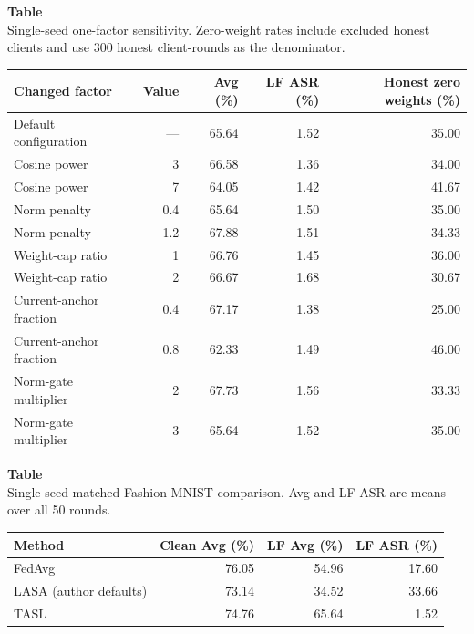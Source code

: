 \noindent\begin{minipage}{\textwidth}
\label{tab:fixed_constant_sensitivity}
\textbf{Table~\thetable}\\
Single-seed one-factor sensitivity. Zero-weight rates include excluded honest clients and use 300 honest client-rounds as the denominator.
\par\smallskip\centering\small
\setlength{\tabcolsep}{6pt}
\begin{tabular}{lrrrr}
\toprule
Changed factor & Value & Avg (\%) & LF ASR (\%) & Honest zero weights (\%) \\
\midrule
Default configuration & --- & 65.64 & 1.52 & 35.00 \\
Cosine power & 3 & 66.58 & 1.36 & 34.00 \\
Cosine power & 7 & 64.05 & 1.42 & 41.67 \\
Norm penalty & 0.4 & 65.64 & 1.50 & 35.00 \\
Norm penalty & 1.2 & 67.88 & 1.51 & 34.33 \\
Weight-cap ratio & 1 & 66.76 & 1.45 & 36.00 \\
Weight-cap ratio & 2 & 66.67 & 1.68 & 30.67 \\
Current-anchor fraction & 0.4 & 67.17 & 1.38 & 25.00 \\
Current-anchor fraction & 0.8 & 62.33 & 1.49 & 46.00 \\
Norm-gate multiplier & 2 & 67.73 & 1.56 & 33.33 \\
Norm-gate multiplier & 3 & 65.64 & 1.52 & 35.00 \\
\bottomrule
\end{tabular}
\end{minipage}

\noindent\begin{minipage}{\textwidth}
\label{tab:recent_baseline}
\textbf{Table~\thetable}\\
Single-seed matched Fashion-MNIST comparison. Avg and LF ASR are means over all 50 rounds.
\par\smallskip\centering\small
\setlength{\tabcolsep}{13pt}
\begin{tabular}{lrrr}
\toprule
Method & Clean Avg (\%) & LF Avg (\%) & LF ASR (\%) \\
\midrule
FedAvg & 76.05 & 54.96 & 17.60 \\
LASA (author defaults) & 73.14 & 34.52 & 33.66 \\
TASL & 74.76 & 65.64 & 1.52 \\
\bottomrule
\end{tabular}
\end{minipage}